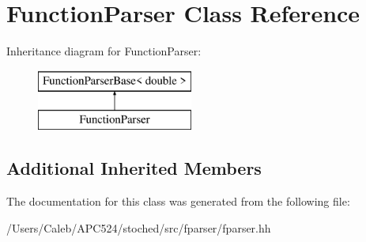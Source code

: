 \hypertarget{class_function_parser}{}\section{Function\+Parser Class Reference}
\label{class_function_parser}
Inheritance diagram for Function\+Parser\+:\begin{figure}[H]
\begin{center}
\leavevmode
\includegraphics[height=2.000000cm]{class_function_parser}
\end{center}
\end{figure}
\subsection*{Additional Inherited Members}


The documentation for this class was generated from the following file\+:\begin{DoxyCompactItemize}
\item 
/\+Users/\+Caleb/\+A\+P\+C524/stoched/src/fparser/fparser.\+hh\end{DoxyCompactItemize}
